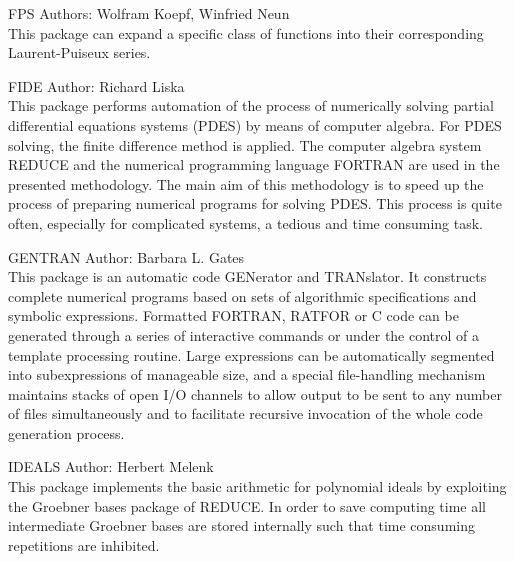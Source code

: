 \begin{Package}{FPS}
 
Authors: Wolfram Koepf, Winfried Neun\\

This package can expand a specific class of functions into their
corresponding Laurent-Puiseux series.
\end{Package}

\begin{Package}{FIDE}
Author:  Richard Liska\\

This package performs  automation of  the process of numerically
solving  partial  differential  equations  systems  (PDES)  by  means of
computer algebra.  For PDES solving, the finite difference method is applied.
The  computer  algebra  system  REDUCE  and  the  numerical  programming
language FORTRAN  are used in the presented methodology. The main aim of
this methodology is to speed up the process of preparing numerical
programs for  solving PDES.  This process is quite often, especially for
complicated systems, a tedious and time consuming task.
\end{Package}

\begin{Package}{GENTRAN}
Author: Barbara L. Gates\\

This package is an automatic code GENerator and TRANslator.  It constructs
complete numerical programs based on sets of algorithmic specifications and
symbolic expressions.  Formatted FORTRAN, RATFOR or C code can be generated
through a series of interactive commands or under the control of a template
processing routine.  Large expressions can be automatically segmented into
subexpressions of manageable size, and a special file-handling mechanism
maintains stacks of open I/O channels to allow output to be sent to any
number of files simultaneously and to facilitate recursive invocation of the
whole code generation process.
\end{Package}

\begin{Package}{IDEALS}
Author: Herbert Melenk\\

This package implements the basic arithmetic for polynomial ideals by
exploiting the Groebner bases package of REDUCE.  In order to save
computing time all intermediate Groebner bases are stored internally such
that time consuming repetitions are inhibited.
\end{Package}

